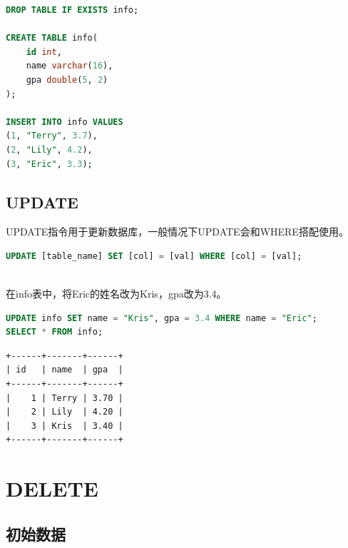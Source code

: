 \documentclass[12pt, openany, oneside]{book}
\begin{document}
\begin{lstlisting}[language=SQL]
DROP TABLE IF EXISTS info;

CREATE TABLE info(
    id int,
    name varchar(16),
    gpa double(5, 2)
);

INSERT INTO info VALUES
(1, "Terry", 3.7),
(2, "Lily", 4.2),
(3, "Eric", 3.3);
\end{lstlisting}

\section{UPDATE}

UPDATE指令用于更新数据库，一般情况下UPDATE会和WHERE搭配使用。

\vspace{-0.5cm}

\begin{lstlisting}[language=SQL]
UPDATE [table_name] SET [col] = [val] WHERE [col] = [val];
\end{lstlisting}

\vspace{0.5cm}

 \\

在info表中，将Eric的姓名改为Kris，gpa改为3.4。

\vspace{-0.5cm}

\begin{lstlisting}[language=SQL]
UPDATE info SET name = "Kris", gpa = 3.4 WHERE name = "Eric";
SELECT * FROM info;
\end{lstlisting}

\begin{tcolorbox}
    \begin{verbatim}
+------+-------+------+
| id   | name  | gpa  |
+------+-------+------+
|    1 | Terry | 3.70 |
|    2 | Lily  | 4.20 |
|    3 | Kris  | 3.40 |
+------+-------+------+
    \end{verbatim}
\end{tcolorbox}

\newpage

\chapter{DELETE}

\section{初始数据}
\end{document}
